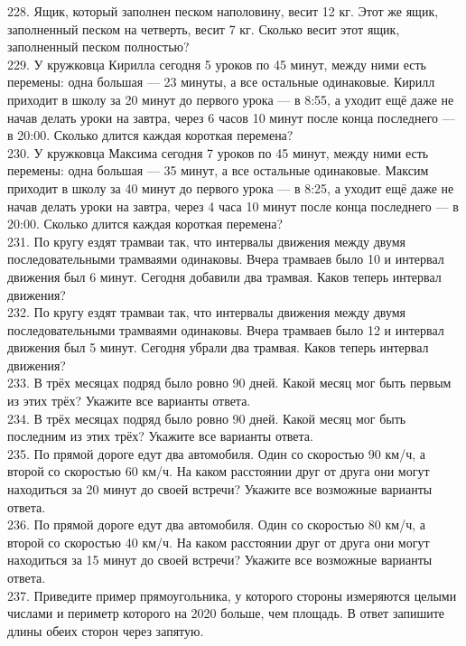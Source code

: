 \documentclass[12pt]{article}
\begin{document}
228. Ящик, который заполнен песком наполовину, весит 12 кг. Этот же ящик, заполненный песком на четверть, весит 7 кг. Сколько весит этот ящик, заполненный песком полностью?\\
229. У кружковца Кирилла сегодня 5 уроков по 45 минут, между ними есть перемены: одна большая --- 23 минуты, а все остальные одинаковые. Кирилл приходит в школу за 20 минут до первого урока --- в 8:55, а уходит ещё даже не начав делать уроки на завтра, через 6 часов 10 минут после конца последнего --- в 20:00. Сколько длится каждая короткая перемена?\\
230. У кружковца Максима сегодня 7 уроков по 45 минут, между ними есть перемены: одна большая --- 35 минут, а все остальные одинаковые. Максим приходит в школу за 40 минут до первого урока --- в 8:25, а уходит ещё даже не начав делать уроки на завтра, через 4 часа 10 минут после конца последнего --- в 20:00. Сколько длится каждая короткая перемена?\\
231. По кругу ездят трамваи так, что интервалы движения между двумя последовательными трамваями одинаковы. Вчера трамваев было 10 и интервал движения был 6 минут. Сегодня добавили два трамвая. Каков теперь интервал движения?\\
232. По кругу ездят трамваи так, что интервалы движения между двумя последовательными трамваями одинаковы. Вчера трамваев было 12 и интервал движения был 5 минут. Сегодня убрали два трамвая. Каков теперь интервал движения?\\
233. В трёх месяцах подряд было ровно 90 дней. Какой месяц мог быть первым из этих трёх? Укажите все варианты ответа.\\
234. В трёх месяцах подряд было ровно 90 дней. Какой месяц мог быть последним из этих трёх? Укажите все варианты ответа.\\
235. По прямой дороге едут два автомобиля. Один со скоростью 90 км/ч, а второй со скоростью 60 км/ч. На каком расстоянии друг от друга они могут находиться за 20 минут до своей встречи? Укажите все возможные варианты ответа.\\
236. По прямой дороге едут два автомобиля. Один со скоростью 80 км/ч, а второй со скоростью 40 км/ч. На каком расстоянии друг от друга они могут находиться за 15 минут до своей встречи? Укажите все возможные варианты ответа.\\
237. Приведите пример прямоугольника, у которого стороны измеряются целыми числами и периметр которого на 2020 больше, чем площадь. В ответ запишите длины обеих сторон через запятую.\\
\end{document}
